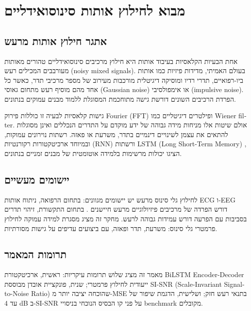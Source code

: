 
\clearpage
\chapter{מבוא לחילוץ אותות סינוסואידליים}

\section{אתגר חילוץ אותות מרעש}

אחת הבעיות הקלאסיות בעיבוד אותות היא חילוץ מרכיבים סינוסואידליים טהורים מאותות מעורבבים המכילים רעש (\textenglish{noisy mixed signals}). בעולם האמיתי, מדידות פיזיות כמו אותות ביו-רפואיים, תדרי רדיו ומוסיקה דיגיטלית מורכבות מעירוב של מספר מרכיבי תדר, כאשר כל אחד מהם מוסיף רעש מתחום גאוסי (\textenglish{Gaussian noise}) או אימפולסיבי (\textenglish{impulsive noise}). הפרדת הרכיבים השונים דורשת גישה מתוחכמת המסוגלת ללמוד מבנים עמוקים בנתונים.

גישות קלאסיות לבעיה זו כוללות פירוק \textenglish{Fourier} (\textenglish{FFT}) ופילטרים דיגיטליים כמו \textenglish{Wiener filter}. אולם שיטות אלו מניחות מידה גבוהה של ידע מוקדם על התדרים הנכללים ואינן מסוגלות להתאים את עצמן לשינויים דינמיים בתדר, משרעת או פאזה. רשתות נוירונים עמוקות, ובמיוחד ארכיטקטורות רקורנטיות (\textenglish{RNN}) ורשתות \textenglish{LSTM} (\textenglish{Long Short-Term Memory}) \cite{hochreiter1997lstm}, הציגו יכולות מרשימות בלמידה אוטומטית של מבנים זמניים בנתונים.

\section{יישומים מעשיים}

לחילוץ גלי סינוס מרעש יש יישומים מגוונים: בתחום הרפואה, ניתוח אותות \textenglish{ECG} ו-\textenglish{EEG} דורש הפרדה של מרכיבים פיזיולוגיים מרעש חיישנים \cite{valentini2019speech}. בתחום התקשורת, זיהוי תדרים בסביבות עם הפרעה דורש עמידות גבוהה לרעש. מחקר זה מציג מסגרת למידה עמוקה לחילוץ פרמטרי גלי סינוס: משרעת, תדר ופאזה, עם ביצועים עדיפים על גישות מסורתיות.

\section{תרומות המאמר}

מאמר זה מציג שלוש תרומות עיקריות: ראשית, ארכיטקטורת \textenglish{BiLSTM Encoder-Decoder} ייעודית לחילוץ פרמטרי; שנית, פונקציית אובדן מבוססת \textenglish{SI-SNR} (\textenglish{Scale-Invariant Signal-to-Noise Ratio}) שהוכחה יציבה יותר מ-\textenglish{MSE} בתנאי רעש חזק; ושלישית, הדגמת שיפור של עד \textenglish{4 dB} ב-\textenglish{SI-SNR} על פני קו הבסיס הנוכחי \cite{luo2019convtasnet} בניסויי \textenglish{benchmark} מקובלים.
